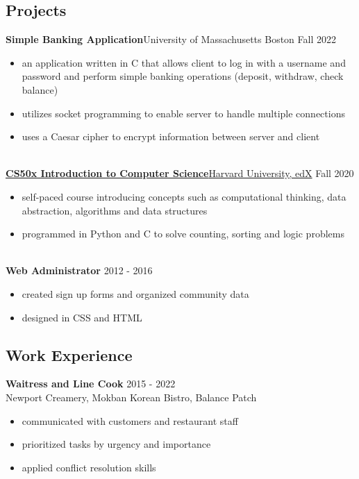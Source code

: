 \documentclass[11pt, letterpaper]{article}
\begin{document}
\subsection*{\color{accent} Projects \xdotfill[.5ex]{.4pt}}
\textbf{Simple Banking Application}\enspace\textbullet\enspace University of Massachusetts Boston
\hfill Fall 2022
\begin{itemize}
\item an application written in C that allows client to log in with a username and password and perform simple banking operations (deposit, withdraw, check balance)
\item utilizes socket programming to enable server to handle multiple connections
\item uses a Caesar cipher to encrypt information between server and client
\end{itemize} 
\ \\
\href{https://www.edx.org/course/introduction-computer-science-harvardx-cs50x}{\textbf{CS50x Introduction to Computer Science}\enspace\textbullet\enspace Harvard University, edX}
\hfill Fall 2020
\begin{itemize}
\item self-paced course introducing concepts such as computational thinking, data abstraction, algorithms and data structures
\item programmed in Python and C to solve counting, sorting and logic problems
\end{itemize} 
\ \\
\textbf{Web Administrator}
\hfill 2012 - 2016
\begin{itemize}
\item created sign up forms and organized community data
\item designed in CSS and HTML
\end{itemize}

\subsection*{\color{accent} Work Experience \xdotfill[.5ex]{.4pt}}
\textbf{Waitress and Line Cook} \hfill 2015 - 2022 \\
Newport Creamery, Mokban Korean Bistro, Balance Patch
\begin{itemize}[noitemsep]
\item communicated with customers and restaurant staff
\item prioritized tasks by urgency and importance
\item applied conflict resolution skills
\end{itemize}
\end{document}
